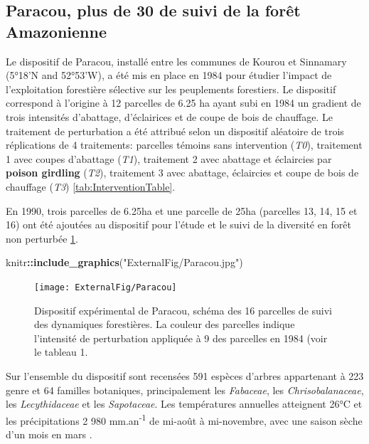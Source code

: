 \documentclass[
  11pt,
  french,
  A4paper,
  extrafontsizes,onecolumn,openright
  ]{memoir}
\newenvironment{Shaded}{\begin{snugshade}}{\end{snugshade}}
\newcommand{\KeywordTok}[1]{\textcolor[rgb]{0.13,0.29,0.53}{\textbf{#1}}}
\newcommand{\StringTok}[1]{\textcolor[rgb]{0.31,0.60,0.02}{#1}}
\newcommand{\OperatorTok}[1]{\textcolor[rgb]{0.81,0.36,0.00}{\textbf{#1}}}
\newcommand{\NormalTok}[1]{#1}
\begin{document}
\subsection{Paracou, plus de 30 de suivi de la forêt
Amazonienne}\label{paracou-plus-de-30-de-suivi-de-la-foret-amazonienne}

Le dispositif de Paracou, installé entre les communes de Kourou et
Sinnamary (5°18'N and 52°53'W), a été mis en place en 1984 pour étudier
l'impact de l'exploitation forestière sélective sur les peuplements
forestiers. Le dispositif correspond à l'origine à 12 parcelles de 6.25
ha ayant subi en 1984 un gradient de trois intensités d'abattage,
d'éclairices et de coupe de bois de chauffage. Le traitement de
perturbation a été attribué selon un dispositif aléatoire de trois
réplications de 4 traitements: parcelles témoins sans intervention
(\emph{T0}), traitement 1 avec coupes d'abattage (\emph{T1}), traitement
2 avec abattage et éclaircies par \textbf{poison girdling} (\emph{T2}),
traitement 3 avec abattage, éclaircies et coupe de bois de chauffage
(\emph{T3}) \ref{tab:InterventionTable}.

En 1990, trois parcelles de 6.25ha et une parcelle de 25ha (parcelles
13, 14, 15 et 16) ont été ajoutées au dispositif pour l'étude et le
suivi de la diversité en forêt non perturbée \ref{fig:ParacouDesign}.

\begin{Shaded}
\begin{Highlighting}[]
\NormalTok{knitr}\OperatorTok{::}\KeywordTok{include_graphics}\NormalTok{(}\StringTok{"ExternalFig/Paracou.jpg"}\NormalTok{)}
\end{Highlighting}
\end{Shaded}

\begin{figure}

{\centering \texttt{[image: ExternalFig/Paracou]} 

}

\caption{Dispositif expérimental de Paracou, schéma des 16 parcelles de suivi des dynamiques forestières. La couleur des parcelles indique l'intensité de perturbation appliquée à 9 des parcelles en 1984 (voir le tableau 1.}\label{fig:ParacouDesign}
\end{figure}

Sur l'ensemble du dispositif sont recensées 591 espèces d'arbres
appartenant à 223 genre et 64 familles botaniques, principalement les
\emph{Fabaceae}, les \emph{Chrisobalanaceae}, les \emph{Lecythidaceae}
et les \emph{Sapotaceae}. Les températures annuelles atteignent 26°C et
les précipitations 2 980 mm.an\textsuperscript{-1} de mi-août à
mi-novembre, avec une saison sèche d'un mois en mars
\autocite{Wagner2011}.
\end{document}
